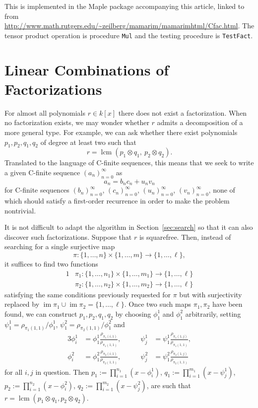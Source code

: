 \documentclass{sig-alternate}
\def\lcm{\operatorname{lcm}}
\begin{document}
This is implemented in the Maple package accompanying this article, linked to from
\url{http://www.math.rutgers.edu/~zeilberg/mamarim/mamarimhtml/Cfac.html}.
The tensor product operation is procedure {\tt Mul} and the testing procedure is {\tt TestFact}.

\section{Linear Combinations of Factorizations}

For almost all polynomials $r\in k[x]$ there does not exist a factorization.
When no factorization exists, we may wonder whether $r$ admits a decomposition of
a more general type. For example, we can ask whether there exist polynomials
$p_1,p_2,q_1,q_2$ of degree at least two such that
\[
  r = \lcm(p_1\otimes q_1, \ p_2\otimes q_2).
\]
Translated to the language of C-finite sequences, this means that we seek to write
a given C-finite sequence $(a_n)_{n=0}^\infty$ as
\[
  a_n = b_nc_n + u_nv_n
\]
for C-finite sequences $(b_n)_{n=0}^\infty$, $(c_n)_{n=0}^\infty$,
$(u_n)_{n=0}^\infty$, $(v_n)_{n=0}^\infty$, none of which should satisfy a first-order
recurrence in order to make the problem nontrivial.

\def\im{\operatorname{im}}
It is not difficult to adapt the algorithm in Section~\ref{sec:search}
so that it can also discover such factorizations.
Suppose that $r$ is squarefree. Then, instead of searching for 
a single surjective map
\[\pi\colon\{1,\dots,n\}\times\{1,\dots,m\}\to\{1,\dots,\ell\},\]
it suffices to find two functions
\begin{alignat*}1
  &\pi_1\colon\{1,\dots,n_1\}\times\{1,\dots,m_1\}\to\{1,\dots,\ell\}\\
  &\pi_2\colon\{1,\dots,n_2\}\times\{1,\dots,m_2\}\to\{1,\dots,\ell\}
\end{alignat*}
satisfying the same conditions previously requested for $\pi$ but with surjectivity replaced by
$\im\pi_1\cup\im\pi_2=\{1,\dots,\ell\}$. Once two such maps $\pi_1,\pi_2$ have been found,
we can construct $p_1,p_2,q_1,q_2$ by choosing $\phi_1^1$ and $\phi_1^2$ arbitrarily,
setting $\psi_1^1=\rho_{\pi_1(1,1)}/\phi_1^1$, $\psi_1^2=\rho_{\pi_2(1,1)}/\phi_1^2$ and
\begin{alignat*}3
  \phi_i^1 &= \phi_1^1\frac{\rho_{\pi_1(i,1)}}{\rho_{\pi_1(1,1)}}, &\qquad
  \psi_j^1 &= \psi_1^1\frac{\rho_{\pi_1(1,j)}}{\rho_{\pi_1(1,1)}}, \\
  \phi_i^2 &= \phi_1^2\frac{\rho_{\pi_2(i,1)}}{\rho_{\pi_2(1,1)}}, &\qquad
  \psi_j^2 &= \psi_1^2\frac{\rho_{\pi_2(1,j)}}{\rho_{\pi_2(1,1)}}
\end{alignat*}
for all $i,j$ in question. Then $p_1:=\prod_{i=1}^{n_1}(x-\phi_i^1)$, $q_1:=\prod_{i=1}^{m_1}(x-\psi_j^1)$,
$p_2:=\prod_{i=1}^{n_2}(x-\phi_i^2)$, $q_2:=\prod_{i=1}^{m_2}(x-\psi_j^2)$,
are such that $r=\lcm(p_1\otimes q_1,p_2\otimes q_2)$. 
\end{document}
